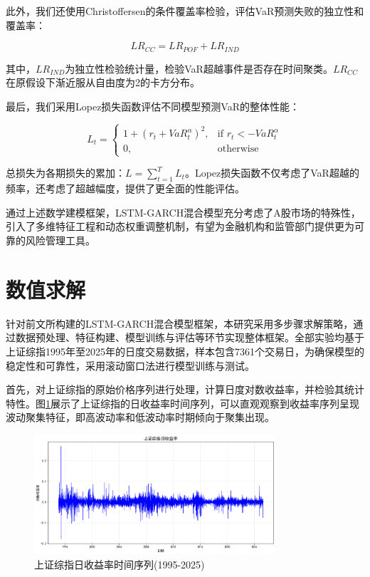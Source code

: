 \documentclass[12pt, a4paper]{article}
\begin{document}
此外，我们还使用Christoffersen的条件覆盖率检验，评估VaR预测失败的独立性和覆盖率：

\begin{equation}
LR_{CC} = LR_{POF} + LR_{IND}
\end{equation}

其中，$LR_{IND}$为独立性检验统计量，检验VaR超越事件是否存在时间聚类。$LR_{CC}$在原假设下渐近服从自由度为2的卡方分布。

最后，我们采用Lopez损失函数评估不同模型预测VaR的整体性能：

\begin{equation}
L_t = \begin{cases}
1 + (r_t + VaR_t^{\alpha})^2, & \text{if } r_t < -VaR_t^{\alpha} \\
0, & \text{otherwise}
\end{cases}
\end{equation}

总损失为各期损失的累加：$L = \sum_{t=1}^{T} L_t$。Lopez损失函数不仅考虑了VaR超越的频率，还考虑了超越幅度，提供了更全面的性能评估。

通过上述数学建模框架，LSTM-GARCH混合模型充分考虑了A股市场的特殊性，引入了多维特征工程和动态权重调整机制，有望为金融机构和监管部门提供更为可靠的风险管理工具。

\section{数值求解}

针对前文所构建的LSTM-GARCH混合模型框架，本研究采用多步骤求解策略，通过数据预处理、特征构建、模型训练与评估等环节实现整体框架。全部实验均基于上证综指1995年至2025年的日度交易数据，样本包含7361个交易日，为确保模型的稳定性和可靠性，采用滚动窗口法进行模型训练与测试。

首先，对上证综指的原始价格序列进行处理，计算日度对数收益率，并检验其统计特性。图\ref{fig:sse_returns_ts}展示了上证综指的日收益率时间序列，可以直观观察到收益率序列呈现波动聚集特征，即高波动率和低波动率时期倾向于聚集出现。

\begin{figure}[htbp]
\centering
\includegraphics[width=0.8\textwidth]{./img/上证综指日收益率.png}
\caption{上证综指日收益率时间序列(1995-2025)}
\label{fig:sse_returns_ts}
\end{figure}
\end{document}
